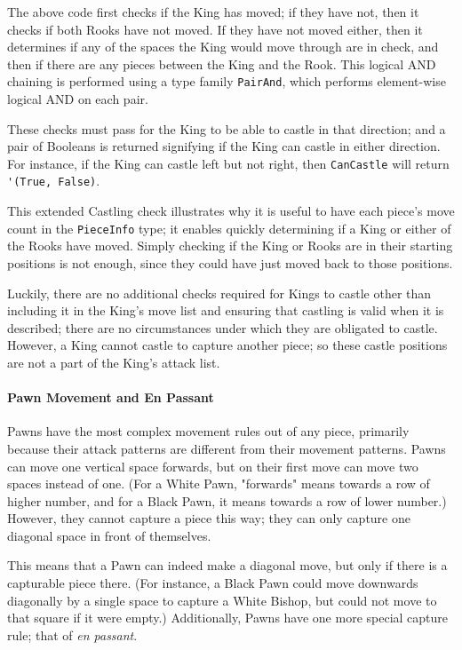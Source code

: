 \documentclass[12pt, a4paper, bibliography=totocnumbered]{scrreprt}
\newcommand{\inline}[1]{\lstinline[basicstyle=\ttfamily\footnotesize]{#1}}
\begin{document}
The above code first checks if the King has moved; if they have not, then it checks if both Rooks have not moved. If they have not moved either, then it determines if any of the spaces the King would move through are in check, and then if there are any pieces between the King and the Rook. This logical AND chaining is performed using a type family \inline{PairAnd}, which performs element-wise logical AND on each pair.

These checks must pass for the King to be able to castle in that direction; and a pair of Booleans is returned signifying if the King can castle in either direction. For instance, if the King can castle left but not right, then \inline{CanCastle} will return \inline{'(True, False)}.

This extended Castling check illustrates why it is useful to have each piece's move count in the \inline{PieceInfo} type; it enables quickly determining if a King or either of the Rooks have moved. Simply checking if the King or Rooks are in their starting positions is not enough, since they could have just moved back to those positions.

Luckily, there are no additional checks required for Kings to castle other than including it in the King's move list and ensuring that castling is valid when it is described; there are no circumstances under which they are obligated to castle. However, a King cannot castle to capture another piece; so these castle positions are not a part of the King's attack list.

\paragraph{Pawn Movement and En Passant} \label{passantsection}

Pawns have the most complex movement rules out of any piece, primarily because their attack patterns are different from their movement patterns. Pawns can move one vertical space forwards, but on their first move can move two spaces instead of one. (For a White Pawn, "forwards" means towards a row of higher number, and for a Black Pawn, it means towards a row of lower number.) However, they cannot capture a piece this way; they can only capture one diagonal space in front of themselves.


This means that a Pawn can indeed make a diagonal move, but only if there is a capturable piece there. (For instance, a Black Pawn could move downwards diagonally by a single space to capture a White Bishop, but could not move to that square if it were empty.) Additionally, Pawns have one more special capture rule; that of \emph{en passant}.
\end{document}
